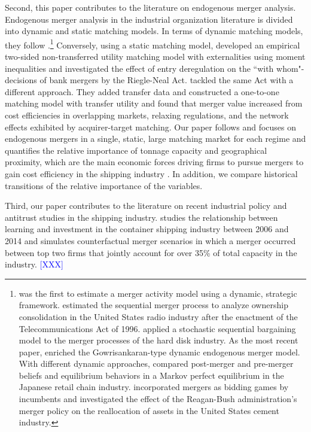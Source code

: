 \documentclass[10pt]{article}
\begin{document}
Second, this paper contributes to the literature on endogenous merger analysis. Endogenous merger analysis in the industrial organization literature is divided into dynamic and static matching models. 
In terms of dynamic matching models, they follow \cite{gowrisankaran1999dynamic}.\footnote{\cite{stahl2011dynamic} was the first to estimate a merger activity model using a dynamic, strategic framework. \cite{jeziorski2014effects} estimated the sequential merger process to analyze ownership consolidation in the United States radio industry after the enactment of the Telecommunications Act of 1996. \cite{igami2019mergers} applied a stochastic sequential bargaining model to the merger processes of the hard disk industry. As the most recent paper, \cite{hollenbeck2020horizontal} enriched the Gowrisankaran-type dynamic endogenous merger model. With different dynamic approaches, \cite{nishida2015better} compared post-merger and pre-merger beliefs and equilibrium behaviors in a Markov perfect equilibrium in the Japanese retail chain industry. \cite{perez2015building} incorporated mergers as bidding games by incumbents and investigated the effect of the Reagan-Bush administration's merger policy on the reallocation of assets in the United States cement industry.} Conversely, using a static matching model, \cite{uetake2019entry} developed an empirical two-sided non-transferred utility matching model with externalities using moment inequalities and investigated the effect of entry deregulation on the ``with whom"-decisions of bank mergers by the Riegle-Neal Act. 
\cite{akkus2015ms} tackled the same Act with a different approach. 
They added transfer data and constructed a one-to-one matching model with transfer utility and found that merger value increased from cost efficiencies in overlapping markets, relaxing regulations, and the network effects exhibited by acquirer-target matching. 
Our paper follows \cite{akkus2015ms} and focuses on endogenous mergers in a single, static, large matching market for each regime and quantifies the relative importance of tonnage capacity and geographical proximity, which are the main economic forces driving firms to pursue mergers to gain cost efficiency in the shipping industry \citep{notteboom2004container}. 
In addition, we compare historical transitions of the relative importance of the variables.

Third, our paper contributes to the literature on recent industrial policy and antitrust studies in the shipping industry. \cite{jeon2022learning} studies the relationship between learning and investment in the container shipping industry between 2006 and 2014 and simulates counterfactual merger scenarios in which a merger occurred between top two firms that jointly account for over 35\% of total capacity in the industry.
\textcolor{blue}{[XXX]}
\end{document}
